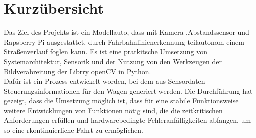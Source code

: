 \section*{Kurzübersicht}
Das Ziel des Projekts ist ein Modellauto, dass mit Kamera ,Abstandssensor und
Rapsberry Pi ausgestattet, durch Fahrbahnlinienerkennung teilautonom einem
Straßenverlauf foglen kann. Es ist eine pratkitsche Umsetzung von Systemarchitektur, 
Sensorik und der Nutzung von den Werkzeugen der Bildverabreitung der Librry openCV 
in Python.\\
Dafür ist ein Prozess entwickelt worden, bei dem aus Sensordaten
Steuerungsinformationen für den Wagen generiert werden. Die Durchführung hat
gezeigt, dass die Umsetzung möglich ist, dass für eine stabile Funktionsweise
weitere Entwicklungen von Funktionen nötig sind, die die zeitkritischen
Anforderungen erfüllen und hardwarebedingte Fehleranfälligkeiten abfangen, um so
eine rkontinuierliche Fahrt zu ermöglichen.\\
